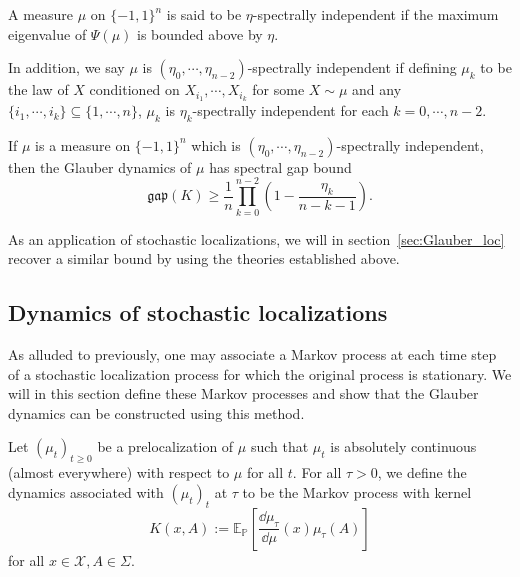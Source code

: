\begin{definition}
  A measure \(\mu\) on \(\{-1, 1\}^n\) is said to be \(\eta\)-spectrally independent if 
  the maximum eigenvalue of \(\Psi(\mu)\) is bounded above by \(\eta\).

  In addition, we say \(\mu\) is \((\eta_0, \cdots, \eta_{n - 2})\)-spectrally independent if defining 
  \(\mu_k\) to be the law of \(X\) conditioned on \(X_{i_1}, \cdots, X_{i_k}\) for some \(X \sim \mu\) and 
  any \(\{i_1, \cdots, i_k\} \subseteq \{1, \cdots, n\}\), \(\mu_k\) is \(\eta_k\)-spectrally independent 
  for each \(k = 0, \cdots, n - 2\).
\end{definition}

\begin{theorem}\label{thm:Anari}
  If \(\mu\) is a measure on \(\{-1, 1\}^n\) which is \((\eta_0, \cdots, \eta_{n - 2})\)-spectrally 
  independent, then the Glauber dynamics of \(\mu\) has spectral gap bound 
  \[\mathfrak{gap}(K) \ge \frac{1}{n} \prod_{k = 0}^{n - 2}\left(1 - \frac{\eta_k}{n - k - 1}\right).\]
\end{theorem}

As an application of stochastic localizations, we will in section~\ref{sec:Glauber_loc} recover a similar
bound by using the theories established above.

\subsection{Dynamics of stochastic localizations}

As alluded to previously, one may associate a Markov process at each time step of a stochastic 
localization process for which the original process is stationary. We will in this section define 
these Markov processes and show that the Glauber dynamics can be constructed using this method. 

\begin{definition}
  Let \((\mu_t)_{t \ge 0}\) be a prelocalization of \(\mu\) such that \(\mu_t\) is absolutely 
  continuous (almost everywhere) with respect to \(\mu\) for all \(t\). For all \(\tau > 0\), we define the dynamics 
  associated with \((\mu_t)_t\) at \(\tau\) to be the Markov process with kernel 
  \[K(x, A) := \mathbb{E}_\mathbb{P}\left[\frac{\dd \mu_\tau}{\dd \mu}(x) \mu_\tau(A)\right]\]
  for all \(x \in \mathcal{X}, A \in \Sigma\).
\end{definition}

